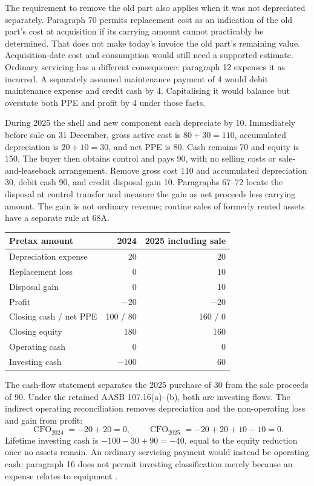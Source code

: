 The requirement to remove the old part also applies when it was not
depreciated separately. Paragraph 70 permits replacement cost as an indication
of the old part's cost at acquisition if its carrying amount cannot practicably
be determined. That does not make today's invoice the old part's remaining
value. Acquisition-date cost and consumption would still need a supported
estimate. Ordinary servicing has a different consequence: paragraph 12
expenses it as incurred. A separately assumed maintenance payment of 4 would
debit maintenance expense and credit cash by 4. Capitalising it would balance
but overstate both PPE and profit by 4 under those facts.

During 2025 the shell and new component each depreciate by 10. Immediately
before sale on 31 December, gross active cost is $80+30=110$, accumulated
depreciation is $20+10=30$, and net PPE is 80. Cash remains 70 and equity is
150. The buyer then obtains control and pays 90, with no selling costs or
sale-and-leaseback arrangement. Remove gross cost 110 and accumulated
depreciation 30, debit cash 90, and credit disposal gain 10. Paragraphs
67--72 locate the disposal at control transfer and measure the gain as net
proceeds less carrying amount. The gain is not ordinary revenue; routine
sales of formerly rented assets have a separate rule at 68A.

\begin{center}
\begin{tabular}{@{}lrr@{}}
\toprule
Pretax amount & 2024 & 2025 including sale\\
\midrule
Depreciation expense & 20 & 20\\
Replacement loss & 0 & 10\\
Disposal gain & 0 & 10\\
Profit & $-20$ & $-20$\\
Closing cash / net PPE & 100 / 80 & 160 / 0\\
Closing equity & 180 & 160\\
Operating cash & 0 & 0\\
Investing cash & $-100$ & 60\\
\bottomrule
\end{tabular}
\end{center}

The cash-flow statement separates the 2025 purchase of 30 from the sale
proceeds of 90. Under the retained AASB 107.16(a)--(b), both are investing
flows. The indirect operating reconciliation removes depreciation and the
non-operating loss and gain from profit:
\[
  \operatorname{CFO}_{2024}=-20+20=0,\qquad
  \operatorname{CFO}_{2025}=-20+20+10-10=0.
\]
Lifetime investing cash is $-100-30+90=-40$, equal to the equity reduction
once no assets remain. An ordinary servicing payment would instead be
operating cash; paragraph 16 does not permit investing classification merely
because an expense relates to equipment \citep{aasb107dated}.

